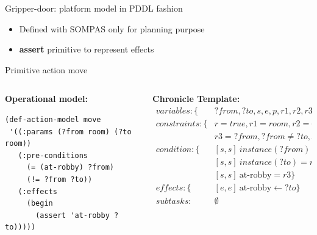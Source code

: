 \begin{frame}[fragile]{Gripper-door: platform model in PDDL fashion}
    \small
    \begin{itemize}
        \item Defined with SOMPAS only for planning purpose
        \pause
        \item \textbf{assert} primitive to represent effects %
        \pause
    \end{itemize}
    Primitive action move
    \begin{columns}[T] %
        \begin{column}{.48\textwidth}
            \small
            \textbf{Operational model:}
            \tiny
            \begin{lstlisting}
(def-action-model move
 '((:params (?from room) (?to room))
   (:pre-conditions  
     (= (at-robby) ?from)
     (!= ?from ?to))
   (:effects
     (begin
       (assert 'at-robby ?to)))))
            \end{lstlisting}
        \end{column}%
        \begin{column}{.48\textwidth}
            \small
            \textbf{Chronicle Template:}
            \tiny
            \begin{align*}
            variables: \{&?from, ?to, s, e, p, r1,r2,r3,r\}\\
            constraints: \{&r = true, r1 = room, r2 = room\\
                & r3 = ?from, ?from \neq ?to, s < e \}\\
            condition:\{&[s,s]\ instance(?from) = r1 \\
                &[s,s]\ instance(?to) = r2\\
                &[s,s]\ \text{at-robby} = r3 \}\\
            effects:\{&[e,e]\ \text{at-robby} \gets ?to\} \\
            subtasks:& \emptyset
            \end{align*}
        \end{column}
    \end{columns}   
    
\end{frame}

